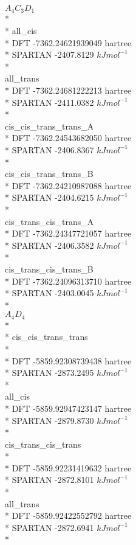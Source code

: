\documentclass{article}
\begin{document}
\(A_{4}C_{3}D_{1}\)\\*\\*
    all\_cis\\*
    DFT -7362.24621939049 hartree\\*
    SPARTAN -2407.8129 \(kJmol^{-1}\)\\*\\
    all\_trans\\*
    DFT -7362.24681222213 hartree\\*
    SPARTAN -2411.0382 \(kJmol^{-1}\)\\*\\
    cis\_cis\_trans\_trans\_A\\*
    DFT -7362.24543682050 hartree\\*
    SPARTAN -2406.8367  \(kJmol^{-1}\)\\*\\
    cis\_cis\_trans\_trans\_B\\*
    DFT -7362.24210987088 hartree \\*
    SPARTAN -2404.6215 \(kJmol^{-1}\)\\*\\
    cis\_trans\_cis\_trans\_A\\*
    DFT -7362.24347721057 hartree\\*
    SPARTAN -2406.3582 \(kJmol^{-1}\)\\*\\
    cis\_trans\_cis\_trans\_B\\*
    DFT -7362.24096313710 hartree\\*
    SPARTAN -2403.0045 \(kJmol^{-1}\)\\*\\
\(A_{4}D_{4}\)\\*\\*
    cis\_cis\_trans\_trans\\*\\*
    DFT -5859.92308739438 hartree\\*
    SPARTAN -2873.2495 \(kJmol^{-1}\)\\*\\
    all\_cis\\*
    DFT -5859.92947423147 hartree\\*
    SPARTAN -2879.8730  \(kJmol^{-1}\)\\*\\
    cis\_trans\_cis\_trans\\*\\*
    DFT  -5859.92231419632 hartree\\*
    SPARTAN -2872.8101 \(kJmol^{-1}\)\\*\\
    all\_trans\\*
    DFT  -5859.92422552792 hartree\\*
    SPARTAN -2872.6941 \(kJmol^{-1}\)\\*\\
    
    
\end{document}
